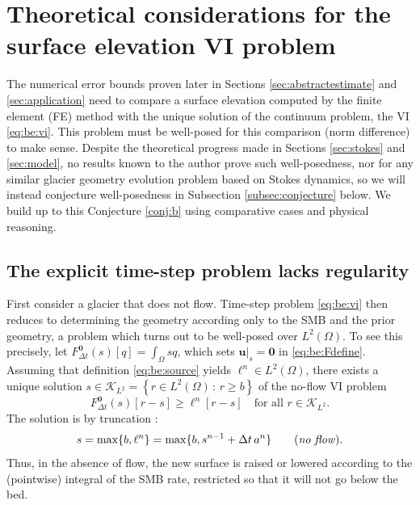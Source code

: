 \documentclass[hidelinks,onefignum,onetabnum,final]{siamart220329}  %
\newcommand{\bu}{\mathbf{u}}
\newcommand{\bzero}{\bm{0}}
\newcommand{\cK}{\mathcal{K}}
\begin{document}
\section{Theoretical considerations for the surface elevation VI problem} \label{sec:theory}

The numerical error bounds proven later in Sections \ref{sec:abstractestimate} and \ref{sec:application} need to compare a surface elevation computed by the finite element (FE) method with the unique solution of the continuum problem, the VI \eqref{eq:be:vi}.  This problem must be well-posed for this comparison (norm difference) to make sense.  Despite the theoretical progress made in Sections \ref{sec:stokes} and \ref{sec:model}, no results known to the author prove such well-posedness, nor for any similar glacier geometry evolution problem based on Stokes dynamics, so we will instead conjecture well-posedness in Subsection \ref{subsec:conjecture} below.  We build up to this Conjecture \ref{conj:b} using comparative cases and physical reasoning.

\subsection{The explicit time-step problem lacks regularity} \label{subsec:explicit}  First consider a glacier that does not flow.  Time-step problem \eqref{eq:be:vi} then reduces to determining the geometry according only to the SMB and the prior geometry, a problem which turns out to be well-posed over $L^2(\Omega)$.  To see this precisely, let $F^{\bzero}_{\Delta t}(s)[q] = \int_\Omega sq$, which sets $\bu|_s=\bzero$ in \eqref{eq:be:Fdefine}.  Assuming that definition \eqref{eq:be:source} yields $\ell^n \in L^2(\Omega)$, there exists a unique solution $s \in \cK_{L^2} = \left\{r\in L^2(\Omega)\,:\,r \ge b\right\}$ of the no-flow VI problem
\begin{equation}
F^{\bzero}_{\Delta t}(s)[r-s] \ge \ell^n[r-s] \quad \text{for all } r \in \cK_{L^2}.
\end{equation}
The solution is by truncation \cite[section II.3]{KinderlehrerStampacchia1980}:
\begin{equation}
s = \max\{b, \ell^n\} = \max\{b, s^{n-1} + \Delta t\,a^n\} \qquad (\text{\emph{no flow}}).
\end{equation}
Thus, in the absence of flow, the new surface is raised or lowered according to the (pointwise) integral of the SMB rate, restricted so that it will not go below the bed.
\end{document}
